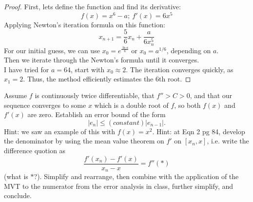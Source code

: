 \documentclass{article}
\begin{document}
\begin{proof}
    First, lets define the function and find its derivative: 
    \[ f(x) = x^6 - a; \ f'(x) = 6x^5 \]
    Applying Newton's iteration formula on this function:
    \[ x_{n+1} = \frac{5}{6}x_n + \frac{a}{6x_n^5} \]
    For our initial guess, we can use \( x_0 = e^{\frac{\ln a}{6}} \) or \( x_0 = a^{1/6} \), depending on \(a\).
    \\
    Then we iterate through the Newton's formula until it converges.
    \\
    I have tried for \( a = 64 \), start with \( x_0 \approx 2 \). The iteration converges quickly, as \( x_1 = 2 \). Thus, the method efficiently estimates the \(6\)th root.
\end{proof}


\begin{problem}
     Assume \(f\) is continuously twice differentiable, that \(f'' >C>0\), and that our sequence converges to some \(x\) which is a double root of \(f\), so both \(f(x)\) and \(f'(x)\) are zero. Establish an error bound of the form
    \[|e_n| \leq (constant) |e_{n-1}|.\]
    Hint: we saw an example of this with \(f(x) = x^2\). Hint: at Eqn 2 pg 84, develop the denominator by using the mean value theorem on \(f'\) on \([x_n,x]\), i.e. write the difference quotion as
    \[\frac{f'(x_n) - f'(x)}{x_n-x} = f''(*)\]
    (what is \(*\)?). Simplify and rearrange, then combine with the application of the MVT to the numerator from the error analysis in class, further simplify, and conclude.
\end{problem}
\end{document}
